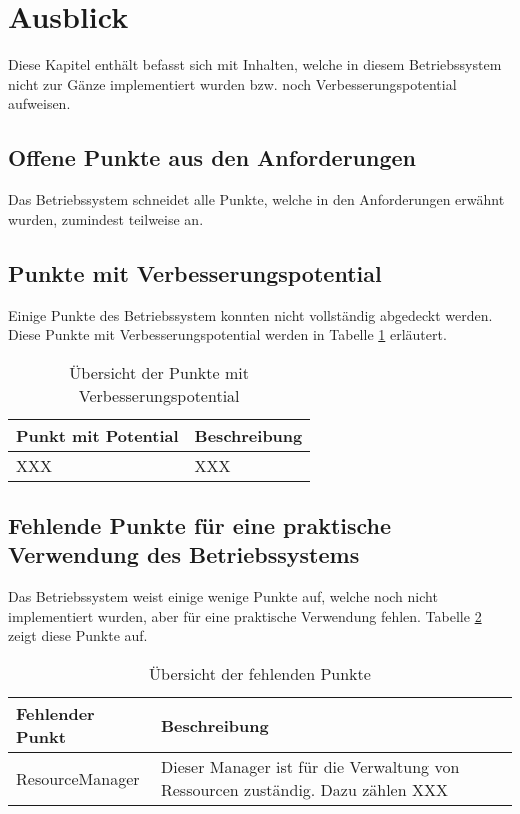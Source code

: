 \section{Ausblick}
\label{Ausblick}
Diese Kapitel enthält befasst sich mit Inhalten, welche in diesem Betriebssystem nicht zur Gänze implementiert wurden bzw. noch Verbesserungspotential aufweisen.

\subsection{Offene Punkte aus den Anforderungen}
Das Betriebssystem schneidet alle Punkte, welche in den Anforderungen erwähnt wurden, zumindest teilweise an.

\subsection{Punkte mit Verbesserungspotential}
Einige Punkte des Betriebssystem konnten nicht vollständig abgedeckt werden. Diese Punkte mit Verbesserungspotential werden in Tabelle \ref{table:points-to-improve} erläutert.

\begin{table}[H]
\begin{tabular}{p{5cm} | p{9cm}}
  \textbf{Punkt mit Potential} & \textbf{Beschreibung}
  \\ \hline
  XXX & XXX \\
  
 \end{tabular}
 \caption{Übersicht der Punkte mit Verbesserungspotential}
 \label{table:points-to-improve}
\end{table}

\subsection{Fehlende Punkte für eine praktische Verwendung des Betriebssystems}
Das Betriebssystem weist einige wenige Punkte auf, welche noch nicht implementiert wurden, aber für eine praktische Verwendung fehlen. Tabelle \ref{table:missing-points} zeigt diese Punkte auf.

\begin{table}[H]
\begin{tabular}{p{5cm} | p{9cm}}
  \textbf{Fehlender Punkt} & \textbf{Beschreibung}
  \\ \hline
  ResourceManager & Dieser Manager ist für die Verwaltung von Ressourcen zuständig. Dazu zählen XXX\\
  
 \end{tabular}
 \caption{Übersicht der fehlenden Punkte}
 \label{table:missing-points}
\end{table}

\pagebreak 